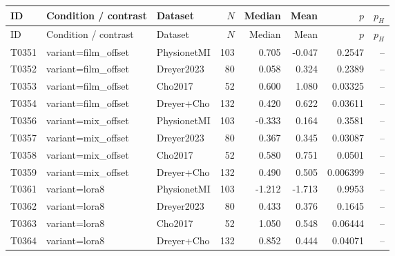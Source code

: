\begin{longtable}{p{.45in}p{2.6in}p{.75in}rrrrr}
\toprule
ID & Condition / contrast & Dataset & $N$ & Median & Mean & $p$ & $p_H$ \\
\midrule
\endfirsthead
\toprule
ID & Condition / contrast & Dataset & $N$ & Median & Mean & $p$ & $p_H$ \\
\midrule
\endhead
T0351 & variant=film\_\allowbreak{}offset & PhysionetMI & 103 & 0.705 & -0.047 & 0.2547 & -- \\
T0352 & variant=film\_\allowbreak{}offset & Dreyer2023 & 80 & 0.058 & 0.324 & 0.2389 & -- \\
T0353 & variant=film\_\allowbreak{}offset & Cho2017 & 52 & 0.600 & 1.080 & 0.03325 & -- \\
T0354 & variant=film\_\allowbreak{}offset & Dreyer+Cho & 132 & 0.420 & 0.622 & 0.03611 & -- \\
T0356 & variant=mix\_\allowbreak{}offset & PhysionetMI & 103 & -0.333 & 0.164 & 0.3581 & -- \\
T0357 & variant=mix\_\allowbreak{}offset & Dreyer2023 & 80 & 0.367 & 0.345 & 0.03087 & -- \\
T0358 & variant=mix\_\allowbreak{}offset & Cho2017 & 52 & 0.580 & 0.751 & 0.0501 & -- \\
T0359 & variant=mix\_\allowbreak{}offset & Dreyer+Cho & 132 & 0.490 & 0.505 & 0.006399 & -- \\
T0361 & variant=lora8 & PhysionetMI & 103 & -1.212 & -1.713 & 0.9953 & -- \\
T0362 & variant=lora8 & Dreyer2023 & 80 & 0.433 & 0.376 & 0.1645 & -- \\
T0363 & variant=lora8 & Cho2017 & 52 & 1.050 & 0.548 & 0.06444 & -- \\
T0364 & variant=lora8 & Dreyer+Cho & 132 & 0.852 & 0.444 & 0.04071 & -- \\
\bottomrule
\end{longtable}
